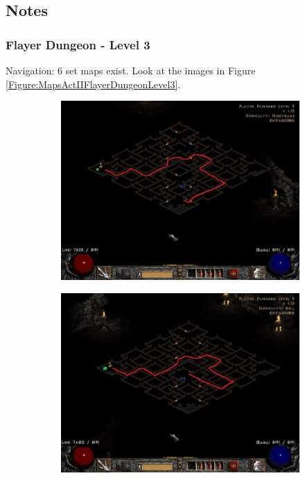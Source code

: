 \clearpage
\subsection{Notes}

\subsubsection{\internallinkicon Flayer Dungeon - Level 3}\label{MapsActIIIFlayerDungeonLevel3}

Navigation: 6 set maps exist. Look at the images in Figure \ref{Figure:MapsActIIFlayerDungeonLevel3}.


\begin{figure}
	\centering
	\begin{subfigure}{0.495\hsize}
		\centering
		\includegraphics[width=\hsize]{Assets/FlayerDungeon3_1}
	\end{subfigure}
	\hfill
	\begin{subfigure}{0.495\hsize}
		\centering
		\includegraphics[width=\hsize]{Assets/FlayerDungeon3_2}
	\end{subfigure}


\end{figure}
